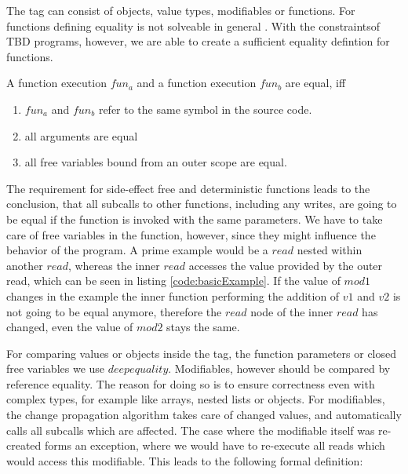 \begin{definition}
\end{definition}

The tag can consist of objects, value types, modifiables or functions. For functions defining equality is not solveable in general \cite{church1936note}. With the constraintsof TBD programs, however, we are able to create a sufficient equality defintion for functions. 
\begin{definition}
\label{def:fun_equality}
A function execution $fun_a$ and a function execution $fun_b$ are equal, iff 
\begin{enumerate}
\item $fun_a$ and $fun_b$ refer to the same symbol in the source code. 
\item all arguments are equal
\item all free variables bound from an outer scope are equal. 
\end{enumerate}
\end{definition}

The requirement for side-effect free and deterministic functions leads to the conclusion, that all subcalls to other functions, including any writes, are going to be equal if the function is invoked with the same parameters. We have to take care of free variables in the function, however, since they might influence the behavior of the program. A prime example would be a $read$ nested within another $read$, whereas the inner $read$ accesses the value provided by the outer read, which can be seen in listing \ref{code:basicExample}. If the value of $mod1$ changes in the example the inner function performing the addition of $v1$ and $v2$ is not going to be equal anymore, therefore the $read$ node of the inner $read$ has changed, even the value of $mod2$ stays the same. 

For comparing values or objects inside the tag, the function parameters or closed free variables we use $deep equality$. Modifiables, however should be compared by reference equality. The reason for doing so is to ensure correctness even with complex types, for example like arrays, nested lists or objects. For modifiables, the change propagation algorithm takes care of changed values, and automatically calls all subcalls which are affected. The case where the modifiable itself was re-created forms an exception, where we would have to re-execute all reads which would access this modifiable. This leads to the following formal definition: 

